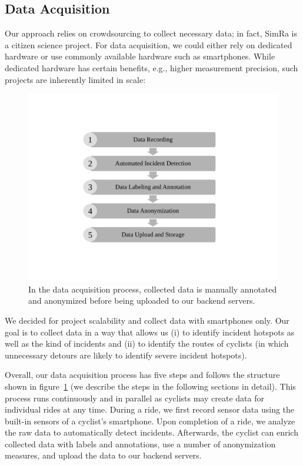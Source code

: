 \subsection{Data Acquisition}
\label{subsec:data_acquisition}
Our approach relies on crowdsourcing to collect necessary data; in fact, SimRa is a citizen science project.
For data acquisition, we could either rely on dedicated hardware or use commonly available hardware such as smartphones.
While dedicated hardware has certain benefits, e.g., higher measurement precision, such projects are inherently limited in scale:
\begin{figure}
    \center
    \includegraphics[width=0.5\columnwidth]{fig/data_acquisition_process.pdf}
    \caption{In the data acquisition process, collected data is manually annotated and anonymized before being uploaded to our backend servers.}
    \label{fig:data_acquisition_process}
\end{figure}
We decided for project scalability and collect data with smartphones only.
Our goal is to collect data in a way that allows us (i) to identify incident hotspots as well as the kind of incidents and (ii) to identify the routes of cyclists (in which unnecessary detours are likely to identify severe incident hotspots).


Overall, our data acquisition process has five steps and follows the structure shown in figure~\ref{fig:data_acquisition_process} (we describe the steps in the following sections in detail).
This process runs continuously and in parallel as cyclists may create data for individual rides at any time.
During a ride, we first record sensor data using the built-in sensors of a cyclist's smartphone.
Upon completion of a ride, we analyze the raw data to automatically detect incidents.
Afterwards, the cyclist can enrich collected data with labels and annotations, use a number of anonymization measures, and upload the data to our backend servers.


